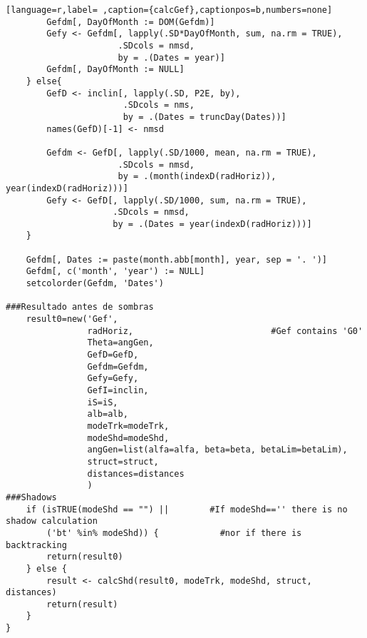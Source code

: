 \begin{lstlisting}[language=r,label= ,caption={calcGef},captionpos=b,numbers=none]
        Gefdm[, DayOfMonth := DOM(Gefdm)]
        Gefy <- Gefdm[, lapply(.SD*DayOfMonth, sum, na.rm = TRUE),
                      .SDcols = nmsd,
                      by = .(Dates = year)]
        Gefdm[, DayOfMonth := NULL]
    } else{
        GefD <- inclin[, lapply(.SD, P2E, by),
                       .SDcols = nms,
                       by = .(Dates = truncDay(Dates))]
        names(GefD)[-1] <- nmsd

        Gefdm <- GefD[, lapply(.SD/1000, mean, na.rm = TRUE),
                      .SDcols = nmsd,
                      by = .(month(indexD(radHoriz)), year(indexD(radHoriz)))]
        Gefy <- GefD[, lapply(.SD/1000, sum, na.rm = TRUE),
                     .SDcols = nmsd,
                     by = .(Dates = year(indexD(radHoriz)))]
    }

    Gefdm[, Dates := paste(month.abb[month], year, sep = '. ')]
    Gefdm[, c('month', 'year') := NULL]
    setcolorder(Gefdm, 'Dates')

###Resultado antes de sombras
    result0=new('Gef',
                radHoriz,                           #Gef contains 'G0'
                Theta=angGen,
                GefD=GefD,
                Gefdm=Gefdm,
                Gefy=Gefy,
                GefI=inclin,
                iS=iS,
                alb=alb,
                modeTrk=modeTrk,
                modeShd=modeShd,
                angGen=list(alfa=alfa, beta=beta, betaLim=betaLim),
                struct=struct,
                distances=distances
                )
###Shadows
    if (isTRUE(modeShd == "") ||        #If modeShd=='' there is no shadow calculation
        ('bt' %in% modeShd)) {            #nor if there is backtracking
        return(result0)
    } else {
        result <- calcShd(result0, modeTrk, modeShd, struct, distances)
        return(result)
    }
}
\end{lstlisting}
